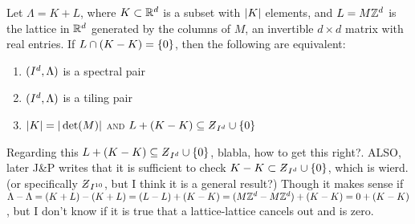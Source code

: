 \documentclass[../thesis.tex]{subfiles}
\begin{document}
\begin{theorem}\label{thrm:periodic_equivalence}
    Let $\Lambda= K + L$, where $K\subset \mathbb{R}^d$ is a subset with $|K|$ elements, and $L=M\mathbb{Z}^d$ is the lattice in $\mathbb{R}^d$ generated by the columns of $M$, an invertible $d\times d$ matrix with real entries. If $L\cap(K-K)= \{0\}$, then the following are equivalent:
    \begin{enumerate}[label=(\roman*), topsep=-3pt]
        \item $(I^d,\Lambda)$ is a spectral pair
        \item $(I^d,\Lambda)$ is a tiling pair  
        \item $|K| = |\det(M)|$ \textsc{and} $L+\brac{K-K}\subseteq \Zstroke_{I^d} \cup \braq{0}$  
    \end{enumerate}
\end{theorem}

\begin{remark}
    Regarding this  $L+\brac{K-K}\subseteq \Zstroke_{I^d} \cup \braq{0}$, blabla, how to get this right?.
    ALSO, later J\&P writes that it is sufficient to check $K-K\subset \Zstroke_{I^d} \cup \braq{0}$, which is wierd. (or specifically $\Zstroke_{I^{10}}$, but I think it is a general result?) Though it makes sense if $\Lambda-\Lambda = (K+L)-(K+L) = (L-L)+(K-K)=(M\mathbb{Z}^d-M\mathbb{Z}^d)+(K-K) = 0+(K-K)$, but I don't know if it is true that a lattice-lattice cancels out and is zero. 
\end{remark}
\end{document}
